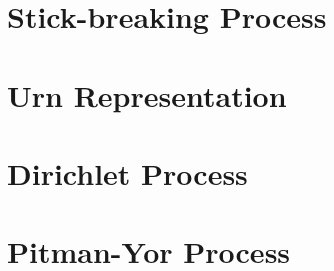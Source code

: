 \section{Stick-breaking Process}

\section{Urn Representation}

\section{Dirichlet Process}

\section{Pitman-Yor Process}
